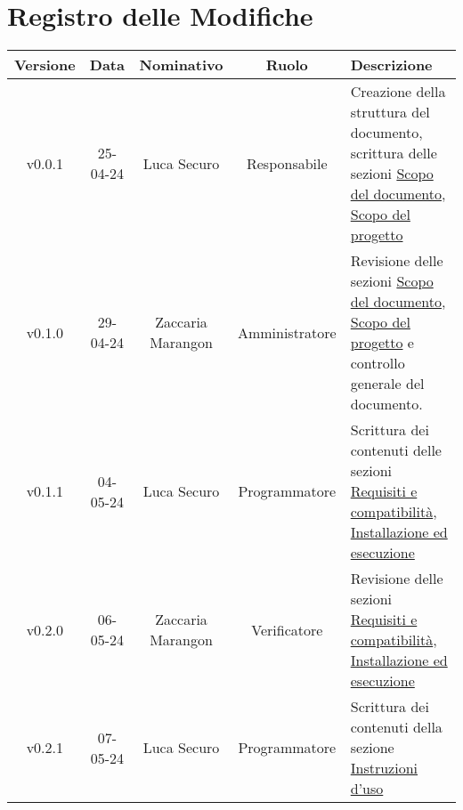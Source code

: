 \section*{\Large Registro delle Modifiche}
    \begin{table}[h]
        \centering
        \renewcommand\tabularxcolumn[1]{m{#1}} %
        \renewcommand{\arraystretch}{1.5}
        \begin{tabularx}{0.98\textwidth}
            {c|c|c|c|>{\centering\arraybackslash}X}
            \rowcolor{black}
            \textbf{\color{white} Versione} & \textbf{\color{white} Data} & \textbf{\color{white} Nominativo} & \textbf{\color{white} Ruolo} & \textbf{\color{white} Descrizione} \\ 
            \hline

            
            
            v0.0.1 & 25-04-24 & Luca Securo & Responsabile & Creazione della struttura del documento, scrittura delle sezioni \hyperref[sec:scopo_del_documento]{Scopo del documento}, 
                                                             \hyperref[sec:scopo_del_progetto]{Scopo del progetto}\\
            v0.1.0 & 29-04-24 & Zaccaria Marangon & Amministratore & Revisione delle sezioni \hyperref[sec:scopo_del_documento]{Scopo del documento}, 
                                                                     \hyperref[sec:scopo_del_progetto]{Scopo del progetto} e controllo generale del documento.\\
            v0.1.1 & 04-05-24 & Luca Securo & Programmatore & Scrittura dei contenuti delle sezioni \hyperref[sec:requisiti_e_compatibilità]{Requisiti
                                                            e compatibilità}, \hyperref[sec:install_run]{Installazione ed esecuzione}\\
            v0.2.0 & 06-05-24 & Zaccaria Marangon & Verificatore & Revisione delle sezioni \hyperref[sec:requisiti_e_compatibilità]{Requisiti
                                                            e compatibilità}, \hyperref[sec:install_run]{Installazione ed esecuzione}\\
            v0.2.1 & 07-05-24 & Luca Securo & Programmatore & Scrittura dei contenuti della sezione \hyperref[sec:Istruzioni_uso]{Instruzioni d'uso}\\
              
            
            \hline
        \end{tabularx}
    \end{table}
